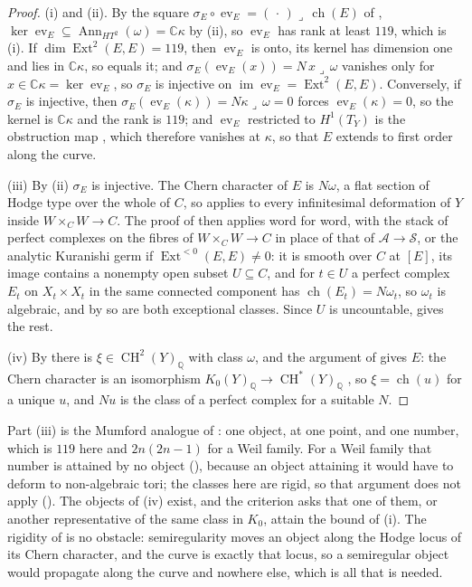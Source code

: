 \documentclass[11pt,reqno]{amsart}
\theoremstyle{plain}
\theoremstyle{definition}
\theoremstyle{remark}
\newcommand{\QQ}{\mathbb{Q}}
\newcommand{\CC}{\mathbb{C}}
\newcommand{\cA}{\mathcal{A}}
\newcommand{\cS}{\mathcal{S}}
\DeclareMathOperator{\CH}{CH}
\DeclareMathOperator{\ch}{ch}
\DeclareMathOperator{\Ext}{Ext}
\DeclareMathOperator{\image}{im}
\DeclareMathOperator{\Ann}{Ann}
\begin{document}
\begin{proof}
(i) and (ii). By the square $\sigma_{E}\circ\operatorname{ev}_{E}=
(\,\cdot\,)\lrcorner\,\ch(E)$ of \cite[Setup~4.54]{paperII}, $\ker
\operatorname{ev}_{E}\subseteq\Ann_{HT^{2}}(\omega)=\CC\kappa$ by
(ii), so $\operatorname{ev}_{E}$ has rank at least
$119$, which is (i). If $\dim\Ext^{2}(E,E)=119$, then
$\operatorname{ev}_{E}$ is onto, its kernel has dimension one and lies in
$\CC\kappa$, so equals it; and $\sigma_{E}(\operatorname{ev}_{E}(x))=
N\,x\lrcorner\,\omega$ vanishes only for $x\in\CC\kappa=\ker
\operatorname{ev}_{E}$, so $\sigma_{E}$ is injective on
$\image\operatorname{ev}_{E}=\Ext^{2}(E,E)$. Conversely, if $\sigma_{E}$ is
injective, then $\sigma_{E}(\operatorname{ev}_{E}(\kappa))=N\kappa\lrcorner
\,\omega=0$ forces $\operatorname{ev}_{E}(\kappa)=0$, so the kernel is
$\CC\kappa$ and the rank is $119$; and $\operatorname{ev}_{E}$ restricted to
$H^{1}(T_{Y})$ is the obstruction map \cite{Tod09}, which therefore vanishes
at $\kappa$, so that $E$ extends to first order along the curve.

(iii) By (ii) $\sigma_{E}$ is injective. The Chern character of $E$ is
$N\omega$, a flat section of Hodge type over the whole of $C$, so
\cite[Theorem~2.2]{paperII} applies to every infinitesimal deformation of $Y$ inside
$W\times_{C}W\to C$. The proof of \cite[Theorem~2.3]{paperII} then applies word
for word, with the stack of perfect complexes on the fibres of $W\times_{C}
W\to C$ \cite{Lie06} in place of that of $\cA\to\cS$, or the analytic
Kuranishi germ if $\Ext^{<0}(E,E)\ne0$: it is smooth over $C$ at $[E]$, its
image contains a nonempty open subset $U\subseteq C$, and for $t\in U$ a
perfect complex $E_{t}$ on $X_{t}\times X_{t}$ in the same connected
component has $\ch(E_{t})=N\omega_{t}$, so $\omega_{t}$ is algebraic, and by
 so are both exceptional classes. Since $U$ is
uncountable,  gives the rest.

(iv) By  there is $\xi\in\CH^{2}(Y)_{\QQ}$ with class
$\omega$, and the argument of \cite[Proposition~2.1]{paperII} gives $E$: the Chern
character is an isomorphism $K_{0}(Y)_{\QQ}\to\CH^{*}(Y)_{\QQ}$
\cite[Ex.~15.2.16(b) and Cor.~18.3.2]{Ful98}, so $\xi=\ch(u)$ for a unique
$u$, and $Nu$ is the class of a perfect complex for a suitable $N$.
\end{proof}

Part (iii) is the Mumford analogue of \cite[Theorem~2.11(iii)]{paperII}: one object,
at one point, and one number, which is $119$ here and $2n(2n-1)$ for a Weil
family. For a Weil family that number is attained by no object
(\cite[Theorem~3.5]{paperII}), because an object attaining it would have to deform to
non-algebraic tori; the classes here are rigid, so that argument does not
apply (\cite[Remark~3.6]{paperII}). The objects of (iv) exist, and the criterion
asks that one of them, or another representative of the same class in
$K_{0}$, attain the bound of (i). The rigidity of  is no obstacle:
semiregularity moves an object along the Hodge locus of its Chern character,
and the curve is exactly that locus, so a semiregular object would propagate
along the curve and nowhere else, which is all that is needed.
\end{document}
